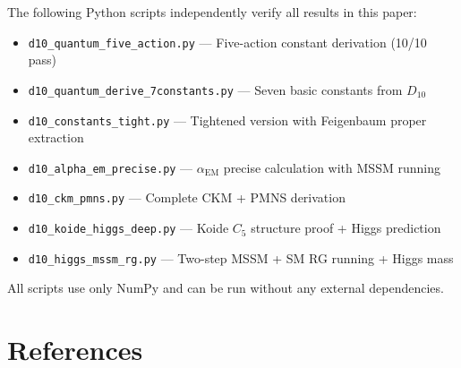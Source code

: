 \documentclass[11pt,a4paper]{article}
\begin{document}
The following Python scripts independently verify all results in this paper:
\begin{itemize}
\item \texttt{d10\_quantum\_five\_action.py} --- Five-action constant derivation (10/10 pass)
\item \texttt{d10\_quantum\_derive\_7constants.py} --- Seven basic constants from $D_{10}$
\item \texttt{d10\_constants\_tight.py} --- Tightened version with Feigenbaum proper extraction
\item \texttt{d10\_alpha\_em\_precise.py} --- $\alpha_{\text{EM}}$ precise calculation with MSSM running
\item \texttt{d10\_ckm\_pmns.py} --- Complete CKM + PMNS derivation
\item \texttt{d10\_koide\_higgs\_deep.py} --- Koide $C_5$ structure proof + Higgs prediction
\item \texttt{d10\_higgs\_mssm\_rg.py} --- Two-step MSSM + SM RG running + Higgs mass
\end{itemize}

All scripts use only NumPy and can be run without any external dependencies.

\section*{References}
\end{document}
